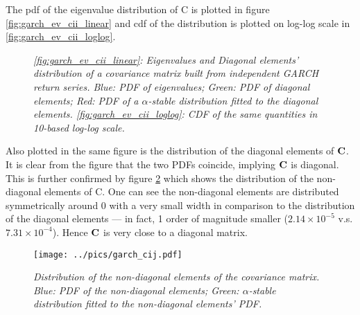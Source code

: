 \documentclass{report}
\begin{document}
The \gls{pdf} of the eigenvalue distribution of C is plotted in figure
\ref{fig:garch_ev_cii_linear} and \gls{cdf} of the distribution is
plotted on log-log scale in \ref{fig:garch_ev_cii_loglog}.
\begin{figure}[htb!]
  \centering
  \caption{\small \it \ref{fig:garch_ev_cii_linear}: Eigenvalues and
    Diagonal elements' distribution of a covariance matrix
    built from independent GARCH return series. Blue: PDF of
    eigenvalues; Green: PDF of diagonal elements; Red: PDF of a
    $\alpha$-stable distribution fitted to the diagonal
    elements. \ref{fig:garch_ev_cii_loglog}: CDF of the same
    quantities in 10-based log-log scale.}
  \label{fig:garch_ev_cii}
\end{figure}
Also plotted in the same figure is the distribution of the diagonal
elements of $\mathbf{C}$. It is clear from the figure that the two PDFs
coincide, implying $\mathbf{C}$ is diagonal. This is further confirmed by
figure \ref{fig:garch_cij} which shows the distribution of the
non-diagonal elements of C. One can see the non-diagonal elements are
distributed symmetrically around 0 with a very small width in
comparison to the distribution of the diagonal elements --- in fact, 1
order of magnitude smaller ($2.14\times10^{-5}$ v.s. $7.31\times
10^{-4}$). Hence $\mathbf{C}$ is very close to a diagonal matrix.
\begin{figure}[htb!]
  \centering
    \texttt{[image: ../pics/garch\_cij.pdf]}
  \caption{\small \it Distribution of the non-diagonal elements of
    the covariance matrix. Blue: PDF of the non-diagonal
    elements; Green: $\alpha$-stable distribution fitted to the
    non-diagonal elements' PDF.}
  \label{fig:garch_cij}
\end{figure}
\end{document}
